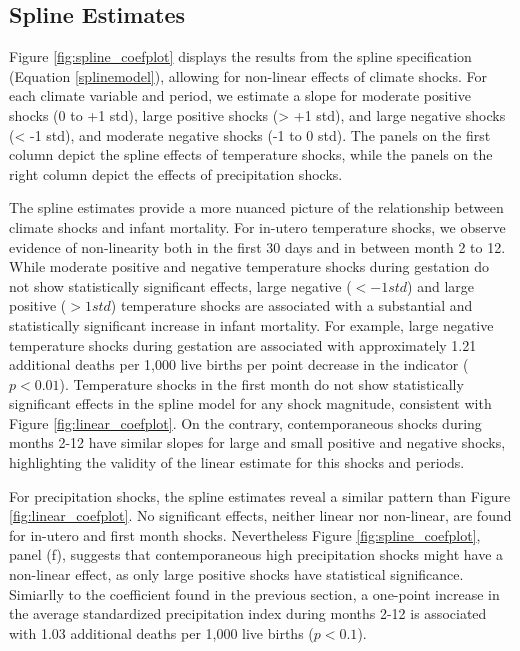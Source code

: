\documentclass[a4paper]{article}
\begin{document}


\subsection{Spline Estimates}


Figure \ref{fig:spline_coefplot} displays the results from the spline specification (Equation \ref{splinemodel}), allowing for non-linear effects of climate shocks.  For each climate variable and period, we estimate a slope for moderate positive shocks (0 to +1 std), large positive shocks (> +1 std), and large negative shocks (< -1 std), and moderate negative shocks (-1 to 0 std). The panels on the first column depict the spline effects of temperature shocks, while the panels on the right column depict the effects of precipitation shocks.

The spline estimates provide a more nuanced picture of the relationship between climate shocks and infant mortality.  For in-utero temperature shocks, we observe evidence of non-linearity both in the first 30 days and in between month 2 to 12.  While moderate positive and negative temperature shocks during gestation do not show statistically significant effects, large negative ($<-1std$) and large positive ($>1 std$) temperature shocks are associated with a substantial and statistically significant increase in infant mortality. For example, large negative temperature shocks during gestation are associated with approximately 1.21 additional deaths per 1,000 live births per point decrease in the indicator ($p < 0.01$). Temperature shocks in the first month do not show statistically significant effects in the spline model for any shock magnitude, consistent with Figure \ref{fig:linear_coefplot}. On the contrary, contemporaneous shocks during months 2-12 have similar slopes for large and small positive and negative shocks, highlighting the validity of the linear estimate for this shocks and periods.

For precipitation shocks, the spline estimates reveal a similar pattern than Figure \ref{fig:linear_coefplot}. No significant effects, neither linear nor non-linear, are found for in-utero and first month shocks. Nevertheless Figure \ref{fig:spline_coefplot}, panel (f), suggests that contemporaneous high precipitation shocks might have a non-linear effect, as only large positive shocks have statistical significance. Simiarlly to the coefficient found in the previous section,  a one-point increase in the average standardized precipitation index during months 2-12 is associated with 1.03 additional deaths per 1,000 live births ($p < 0.1$).
\end{document}
